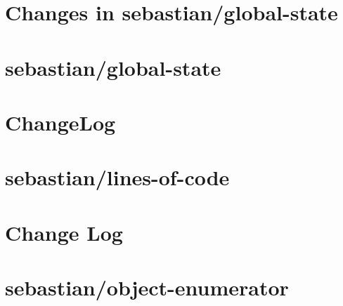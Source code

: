 \documentclass[twoside]{book}
\newcommand{\+}{\discretionary{\mbox{\scriptsize$\hookleftarrow$}}{}{}}
\begin{document}
\chapter{Changes in sebastian/global-\/state}
\label{md__c__workspace__proyecto__p_h_p_project_vendor_sebastian_global_state__change_log}

\chapter{sebastian/global-\/state}
\label{md__c__workspace__proyecto__p_h_p_project_vendor_sebastian_global_state__r_e_a_d_m_e}

\chapter{Change\+Log}
\label{md__c__workspace__proyecto__p_h_p_project_vendor_sebastian_lines_of_code__change_log}

\chapter{sebastian/lines-\/of-\/code}
\label{md__c__workspace__proyecto__p_h_p_project_vendor_sebastian_lines_of_code__r_e_a_d_m_e}

\chapter{Change Log}
\label{md__c__workspace__proyecto__p_h_p_project_vendor_sebastian_object_enumerator__change_log}

\chapter{sebastian/object-\/enumerator}
\label{md__c__workspace__proyecto__p_h_p_project_vendor_sebastian_object_enumerator__r_e_a_d_m_e}

\end{document}
